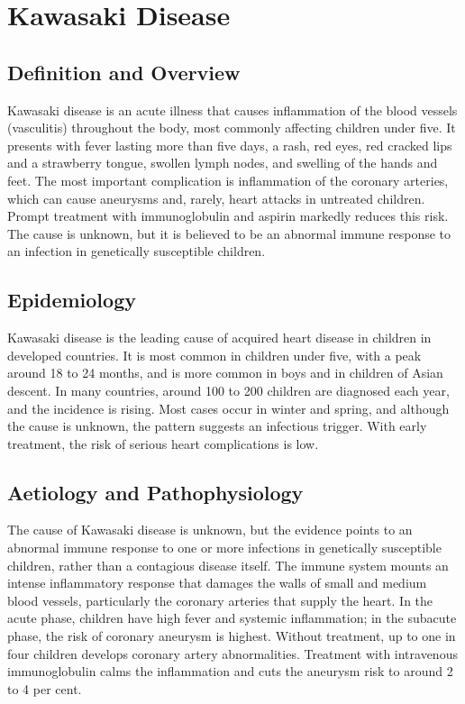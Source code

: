 \chapter{Kawasaki Disease}

\section*{Definition and Overview}
Kawasaki disease is an acute illness that causes inflammation of the blood vessels (vasculitis) throughout the body, most commonly affecting children under five. It presents with fever lasting more than five days, a rash, red eyes, red cracked lips and a strawberry tongue, swollen lymph nodes, and swelling of the hands and feet. The most important complication is inflammation of the coronary arteries, which can cause aneurysms and, rarely, heart attacks in untreated children. Prompt treatment with immunoglobulin and aspirin markedly reduces this risk. The cause is unknown, but it is believed to be an abnormal immune response to an infection in genetically susceptible children.

\section*{Epidemiology}
Kawasaki disease is the leading cause of acquired heart disease in children in developed countries. It is most common in children under five, with a peak around 18 to 24 months, and is more common in boys and in children of Asian descent. In many countries, around 100 to 200 children are diagnosed each year, and the incidence is rising. Most cases occur in winter and spring, and although the cause is unknown, the pattern suggests an infectious trigger. With early treatment, the risk of serious heart complications is low.

\section*{Aetiology and Pathophysiology}
The cause of Kawasaki disease is unknown, but the evidence points to an abnormal immune response to one or more infections in genetically susceptible children, rather than a contagious disease itself. The immune system mounts an intense inflammatory response that damages the walls of small and medium blood vessels, particularly the coronary arteries that supply the heart. In the acute phase, children have high fever and systemic inflammation; in the subacute phase, the risk of coronary aneurysm is highest. Without treatment, up to one in four children develops coronary artery abnormalities. Treatment with intravenous immunoglobulin calms the inflammation and cuts the aneurysm risk to around 2 to 4 per cent.

